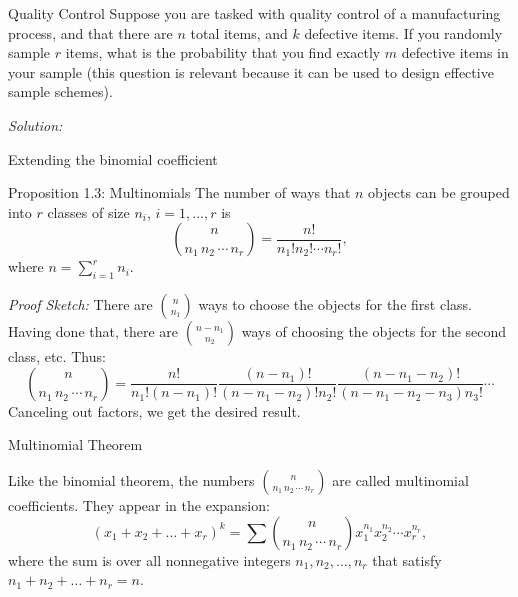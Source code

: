 \begin{frame}{Quality Control}
  Suppose you are tasked with quality control of a manufacturing process, and that there are $n$ total items, and $k$ defective items. If you randomly sample $r$ items, what is the probability that you find exactly $m$ defective items in your sample (this question is relevant because it can be used to design effective sample schemes).
  
  \emph{Solution:}
  
  
  
\end{frame}

\begin{frame}{Extending the binomial coefficient}
  \begin{block}{Proposition 1.3: Multinomials}
    The number of ways that $n$ objects can be grouped into $r$ classes of size $n_i$,  $i = 1, \ldots, r$ is
    $$
    \binom{n}{n_1\,n_2\,\cdots\,n_r} = \frac{n!}{n_1!n_2!\cdots n_r!},
    $$
    where $n = \sum_{i = 1}^r n_i$.
  \end{block}
  
  \emph{Proof Sketch:} There are $\binom{n}{n_1}$ ways to choose the objects for the first class. Having done that, there are $\binom{n-n_1}{n_2}$ ways of choosing the objects for the second class, etc. Thus:
  $$
  \binom{n}{n_1\,n_2\,\cdots\,n_r} = \frac{n!}{n_1!(n - n_1)!}\frac{(n-n_1)!}{(n - n_1 - n_2)!n_2!}\frac{(n - n_1 - n_2)!}{(n-n_1-n_2-n_3)n_3!}\cdots
  $$
  Canceling out factors, we get the desired result. 

\end{frame}

\begin{frame}{Multinomial Theorem}

Like the binomial theorem, the numbers $\binom{n}{n_1\,n_2\,\cdots\,n_r}$ are called \alert{multinomial coefficients}. They appear in the expansion: 
$$
(x_1 + x_2 + \ldots + x_r)^k = \sum \binom{n}{n_1\, n_2\, \cdots\, n_r}x_1^{n_1}x_2^{n_2}\cdots x_{r}^{n_r},
$$
where the sum is over all nonnegative integers $n_1, n_2, \ldots, n_r$ that satisfy $n_1 + n_2 + \ldots + n_r = n$. 

\end{frame}

